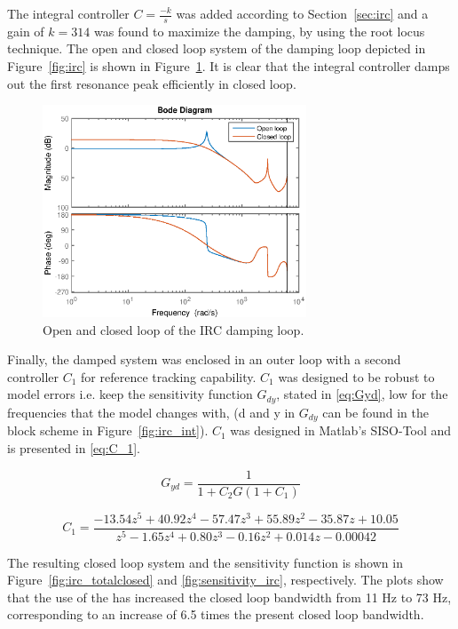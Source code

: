 The integral controller $C=\frac{-k}{s}$ was added according to Section~\ref{sec:irc} and a gain of $k=314$ was found to maximize the damping, by using the root locus technique.
The open and closed loop system of the \abbrIRC damping loop depicted in Figure~\ref{fig:irc} is shown in Figure~\ref{fig:bodedamped}. It is clear that the integral controller damps out the first resonance peak efficiently in closed loop.

\begin{figure}[h!]
  \centering
  \includegraphics[width=0.7\textwidth]{fig/matlab/bodedamped.eps}
  \caption{\label{fig:bodedamped} Open and closed loop of the IRC damping loop.}
\end{figure}

Finally, the damped system was enclosed in an outer loop with a second controller $C_1$ for reference tracking capability. $C_1$ was designed to be robust to model errors i.e. keep the sensitivity function $G_{dy}$, stated in \eqref{eq:Gyd}, low for the frequencies that the model changes with, (d and y in $G_{dy}$ can be found in the block scheme in Figure~\ref{fig:irc_int}). $C_1$ was designed in Matlab's  SISO-Tool and is presented in \eqref{eq:C_1}.

\begin{equation}
  \label{eq:Gyd}
  G_{yd} = \frac{1}{1 + C_2G(1 + C_1)}
\end{equation}

\begin{equation}
  \label{eq:C_1}
  C_1 = \frac{-13.54 z^5 + 40.92 z^4 - 57.47 z^3 + 55.89 z^2 - 35.87 z + 10.05}{z^5 - 1.65 z^4 + 0.80 z^3 - 0.16 z^2 + 0.014 z - 0.00042}
\end{equation}

The resulting closed loop system and the sensitivity function is shown in Figure~\ref{fig:irc_totalclosed} and \ref{fig:sensitivity_irc}, respectively. The plots show that the use of the \abbrIRC has increased the closed loop bandwidth from 11 Hz to 73 Hz, corresponding to an increase of 6.5 times the present closed loop bandwidth.

